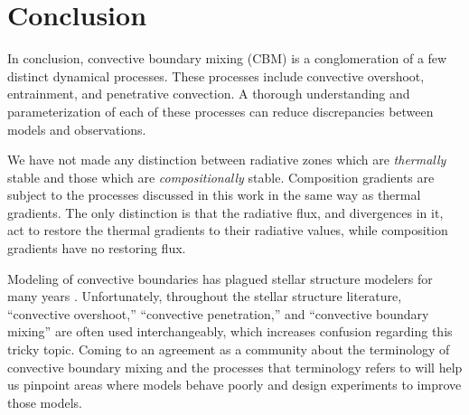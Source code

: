 \section{Conclusion}
\label{sec:conclusions}
In conclusion, convective boundary mixing (CBM) is a conglomeration of a few distinct dynamical processes.
These processes include convective overshoot, entrainment, and penetrative convection.
A thorough understanding and parameterization of each of these processes can reduce discrepancies between models and observations.

We have not made any distinction between radiative zones which are \emph{thermally} stable and those which are \emph{compositionally} stable.
Composition gradients are subject to the processes discussed in this work in the same way as thermal gradients.
The only distinction is that the radiative flux, and divergences in it, act to restore the thermal gradients to their radiative values, while composition gradients have no restoring flux.

Modeling of convective boundaries has plagued stellar structure modelers for many years \citep{mesa1, mesa4, mesa5}.
Unfortunately, throughout the stellar structure literature, ``convective overshoot,'' ``convective penetration,'' and ``convective boundary mixing'' are often used interchangeably, which increases confusion regarding this tricky topic.
Coming to an agreement as a community about the terminology of convective boundary mixing and the processes that terminology refers to will help us pinpoint areas where models behave poorly and design experiments to improve those models.


